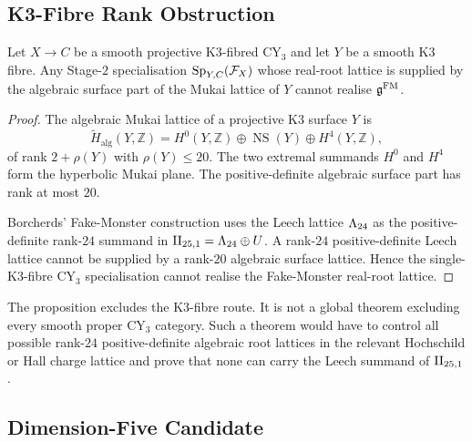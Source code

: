 \subsection{K3-Fibre Rank Obstruction}
\label{wn:subsec:k3-fibre-rank-obstruction}

\begin{proposition}
\label{wn:prop:k3-fibre-fake-monster-obstruction}
Let $X\to C$ be a smooth projective K3-fibred CY$_3$ and let
$Y$ be a smooth K3 fibre. Any Stage-$2$ specialisation
$\mathrm{Sp}_{Y,C}(\mathcal F_X)$ whose real-root lattice is supplied by the
algebraic surface part of the Mukai lattice of $Y$ cannot realise
$\mathfrak{g}^{\mathrm{FM}}$.
\end{proposition}

\begin{proof}
The algebraic Mukai lattice of a projective K3 surface $Y$ is
\[
  \widetilde H_{\mathrm{alg}}(Y,\mathbb Z)
  =
  H^0(Y,\mathbb Z)\oplus \operatorname{NS}(Y)\oplus H^4(Y,\mathbb Z),
\]
of rank $2+\rho(Y)$ with $\rho(Y)\leq 20$. The two extremal summands
$H^0$ and $H^4$ form the hyperbolic Mukai plane. The positive-definite
algebraic surface part has rank at most $20$.

Borcherds' Fake-Monster construction uses the Leech lattice $\Lambda_{24}$ as
the positive-definite rank-$24$ summand in
$\mathrm{II}_{25,1}=\Lambda_{24}\oplus U$. A rank-$24$ positive-definite Leech lattice
cannot be supplied by a rank-$20$ algebraic surface lattice. Hence the
single-K3-fibre CY$_3$ specialisation cannot realise the Fake-Monster
real-root lattice.
\end{proof}

\begin{remark}
\label{wn:rmk:fake-monster-cy3-scope}
The proposition excludes the K3-fibre route. It is not a global theorem
excluding every smooth proper CY$_3$ category. Such a theorem would have
to control all possible rank-$24$ positive-definite algebraic root
lattices in the relevant Hochschild or Hall charge lattice and prove that
none can carry the Leech summand of $\mathrm{II}_{25,1}$.
\end{remark}

\subsection{Dimension-Five Candidate}
\label{wn:subsec:fake-monster-d5-candidate}

